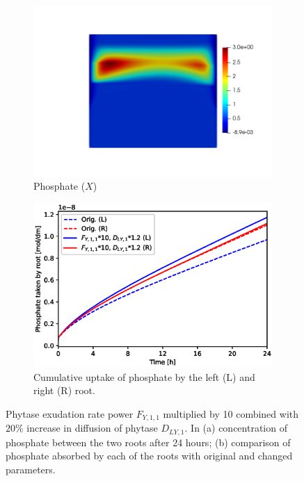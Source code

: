 \documentclass[11pt]{article}
\begin{document}
\begin{figure}[!htb]
\centering
\begin{subfigure}[t]{0.45\textwidth}
    \includegraphics[trim= 100 100 60 100,width=\textwidth]{Figures/X_Fy11times10Y1up20pc.png}
    \caption{Phosphate ($X$)}
\end{subfigure}
\qquad
\begin{subfigure}[t]{0.45\textwidth}
    \includegraphics[width=\textwidth]{Figures/Fy11times10DY1up20pc.eps}
    \caption{Cumulative uptake of phosphate by the left (L) and right (R) root.}
\end{subfigure}

\caption{Phytase exudation rate power $F_{Y,1,1}$ multiplied by 10 combined with $20\%$ increase in diffusion of phytase $D_{LY,1}$. In (a) concentration of phosphate between the two roots after 24 hours; (b) comparison of phosphate absorbed by each of the roots with original and changed parameters.}
\end{figure}
\end{document}

